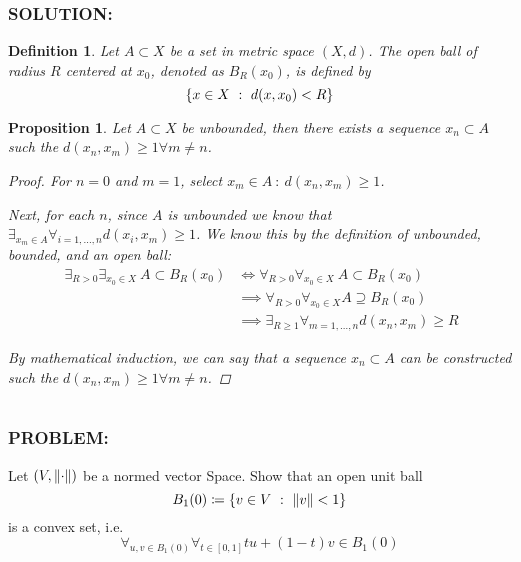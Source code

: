 \documentclass[]{article}
\newcommand{\Problem}{\subsubsection*{\textbf{PROBLEM:}}}
\newcommand{\Solution}{\subsubsection*{\textbf{SOLUTION:}}}
\newcommand{\st}{\ : \ }
\newtheorem{definition}{Definition}
\newtheorem{proposition}{Proposition}
\begin{document}
\Solution
\begin{definition}
    Let $A \subset X$ be a set in metric space $(X,d)$.
    The open ball of radius $R$ centered at $x_0$, denoted as $B_R(x_0)$, is defined by \[
        \qty{x \in X \st d(x,x_0) < R}
    \]
\end{definition}
\begin{proposition}
    Let $A \subset X$ be unbounded, then there exists a sequence ${x_n} \subset A$ such the $d(x_n,x_m) \geq 1 \forall m \neq n$.
    \begin{proof}
        For $n = 0$ and $m = 1$, select $x_m \in A \st d(x_n, x_m) \geq 1$.

        Next, for each $n$, since $A$ is unbounded we know that $\exists_{x_m \in A} \forall_{i = 1, \dots, n} d(x_i,x_m) \geq 1$. 
        We know this by the definition of unbounded, bounded, and an open ball: \begin{align*}
            ~\exists_{R>0} \exists_{x_0\in X} \ A \subset B_R(x_0) 
            &\iff \forall_{R>0} \forall_{x_0 \in X} ~ A \subset B_R(x_0)\\
            &\implies \forall_{R>0} \forall_{x_0 \in X} A \supseteq B_R(x_0)\\
            &\implies \exists_{R \geq 1} \forall_{m = 1, \dots, n} d(x_n, x_m) \geq R
        \end{align*}

        By mathematical induction, we can say that a sequence ${x_n} \subset A$ can be constructed such the $d(x_n,x_m) \geq 1 \forall m \neq n$.
    \end{proof}
\end{proposition} 

\newpage
\section{}
\Problem
Let $(V, \norm{\cdot})$ be a normed vector Space.
Show that an open unit ball \[
    B_1(0) \coloneqq \{v \in V \st \norm{v} < 1\}
\] is a convex set, i.e. \[
    \forall_{u,v \in B_1(0)} \forall_{t \in [0,1]} tu + (1-t) v \in B_1(0)
\]
\end{document}
